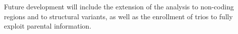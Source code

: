 Future development will include the extension of the analysis to non-coding regions and to structural variants, as well as the enrollment of trios to fully exploit parental information.  


















